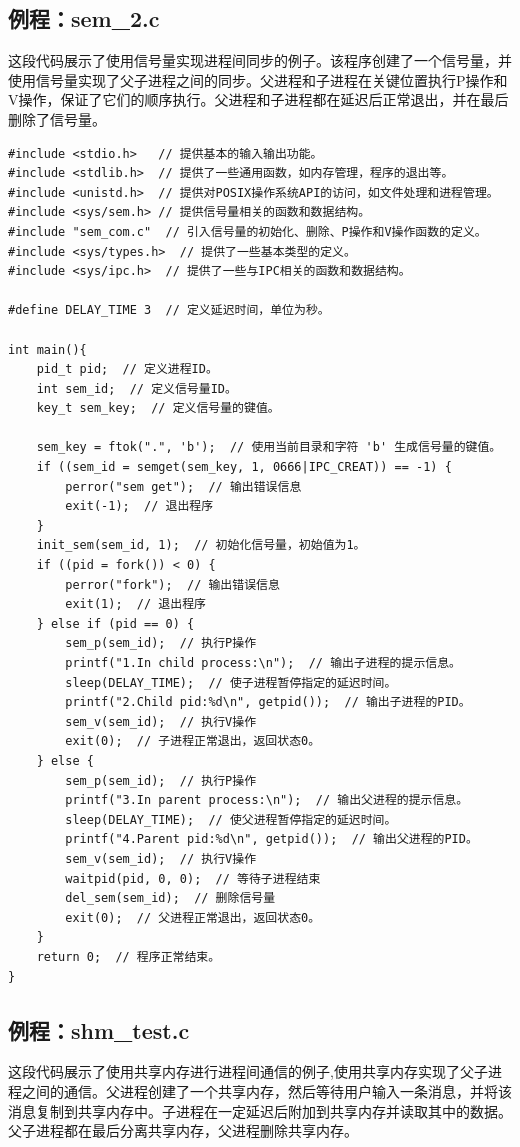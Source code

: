 \documentclass[12pt, a4paper, oneside]{ctexbook}
\numberwithin{figure}{section}
\begin{document}
\subsection{例程：sem_2.c}
这段代码展示了使用信号量实现进程间同步的例子。该程序创建了一个信号量，并使用信号量实现了父子进程之间的同步。父进程和子进程在关键位置执行P操作和V操作，保证了它们的顺序执行。父进程和子进程都在延迟后正常退出，并在最后删除了信号量。
\begin{verbatim}
#include <stdio.h>   // 提供基本的输入输出功能。
#include <stdlib.h>  // 提供了一些通用函数，如内存管理，程序的退出等。
#include <unistd.h>  // 提供对POSIX操作系统API的访问，如文件处理和进程管理。
#include <sys/sem.h> // 提供信号量相关的函数和数据结构。
#include "sem_com.c"  // 引入信号量的初始化、删除、P操作和V操作函数的定义。
#include <sys/types.h>  // 提供了一些基本类型的定义。
#include <sys/ipc.h>  // 提供了一些与IPC相关的函数和数据结构。

#define DELAY_TIME 3  // 定义延迟时间，单位为秒。

int main(){
    pid_t pid;  // 定义进程ID。
    int sem_id;  // 定义信号量ID。
    key_t sem_key;  // 定义信号量的键值。

    sem_key = ftok(".", 'b');  // 使用当前目录和字符 'b' 生成信号量的键值。
    if ((sem_id = semget(sem_key, 1, 0666|IPC_CREAT)) == -1) {
        perror("sem get");  // 输出错误信息
        exit(-1);  // 退出程序
    }
    init_sem(sem_id, 1);  // 初始化信号量，初始值为1。
    if ((pid = fork()) < 0) {
        perror("fork");  // 输出错误信息
        exit(1);  // 退出程序
    } else if (pid == 0) {
        sem_p(sem_id);  // 执行P操作
        printf("1.In child process:\n");  // 输出子进程的提示信息。
        sleep(DELAY_TIME);  // 使子进程暂停指定的延迟时间。
        printf("2.Child pid:%d\n", getpid());  // 输出子进程的PID。
        sem_v(sem_id);  // 执行V操作
        exit(0);  // 子进程正常退出，返回状态0。
    } else {
        sem_p(sem_id);  // 执行P操作
        printf("3.In parent process:\n");  // 输出父进程的提示信息。
        sleep(DELAY_TIME);  // 使父进程暂停指定的延迟时间。
        printf("4.Parent pid:%d\n", getpid());  // 输出父进程的PID。
        sem_v(sem_id);  // 执行V操作
        waitpid(pid, 0, 0);  // 等待子进程结束
        del_sem(sem_id);  // 删除信号量
        exit(0);  // 父进程正常退出，返回状态0。
    }
    return 0;  // 程序正常结束。
}

\end{verbatim}

\subsection{例程：shm_test.c}
这段代码展示了使用共享内存进行进程间通信的例子,使用共享内存实现了父子进程之间的通信。父进程创建了一个共享内存，然后等待用户输入一条消息，并将该消息复制到共享内存中。子进程在一定延迟后附加到共享内存并读取其中的数据。父子进程都在最后分离共享内存，父进程删除共享内存。
\end{document}
